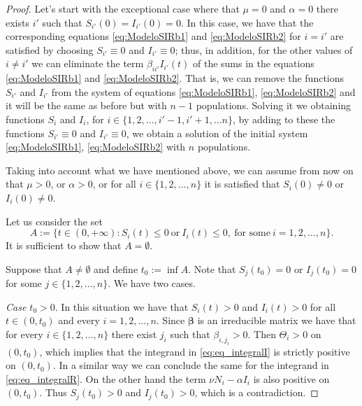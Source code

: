\documentclass[a4paper,10pt]{article}
\theoremstyle{remark}
\begin{document}
\begin{proof} 
Let's start with the exceptional case where that $\mu=0$ and $\alpha=0$ there exists $i'$ such that $S_{i'}(0)=I_{i'}(0)=0$. In this case, we have that the corresponding equations \eqref{eq:ModeloSIRb1} and \eqref{eq:ModeloSIRb2} for $i=i'$ are satisfied by choosing $S_{i'}\equiv 0$ and $I_{i'}\equiv 0$;  thus, in addition, for the other values of $i\neq i'$ we can eliminate the term $\beta_{ii'}I_{i'}(t)$ of the sums in the equations \eqref{eq:ModeloSIRb1} and \eqref{eq:ModeloSIRb2}. That is, we can remove the functions $S_{i'}$ and $I_{i'}$ from the system of equations \eqref{eq:ModeloSIRb1}, \eqref{eq:ModeloSIRb2} and it will be the same as before but with $n-1$ populations. Solving it we obtaining functions $S_{i}$ and $I_i$, for $i\in\{1,2,\ldots,i'-1,i'+1,\ldots n\}$, by adding to these the functions $S_{i'}\equiv 0$ and $I_{i'}\equiv 0$, we obtain a solution of the initial system \eqref{eq:ModeloSIRb1}, \eqref{eq:ModeloSIRb2} with $n$ populations.

Taking into account what we have mentioned above, we can assume from now on that $\mu>0$, or $\alpha>0$, or for all $i\in\{1,2,\ldots,n\}$ it is satisfied that $S_i(0)\neq 0$ or $I_i(0)\neq 0$.


Let us consider the set
$$A:=\{t\in (0,+\infty): S_i(t)\leq 0\ \text{or}\ I_i(t)\leq 0,\ \text{for some}\ i=1,2,\ldots,n\}.$$
It is sufficient to show that $A=\emptyset$. 

Suppose that $A\neq \emptyset$ and define $t_0:=\inf A$.
Note that  $S_j(t_0)=0$ or $I_j(t_0)=0$ for some 
$j\in\{1,2,\ldots,n\}$.  We have two cases. 

\emph{Case $t_0>0.$} In this situation we have that $S_i(t)>0$ and $I_i(t)>0$ for all $t\in (0,t_0)$ and every $i=1,2,\ldots,n$. Since $\boldsymbol{\beta}$ is an irreducible matrix we have that for every $i\in\{1,2,\ldots,n\}$ there exist $j_i$ such that $\beta_{i,j_i}>0$. Then $\Theta_i>0$ on $(0,t_0)$, which implies that the integrand in \eqref{eq:eq_integralI} is strictly positive on $(0,t_0)$. In a similar way we can conclude the same for the integrand in \eqref{eq:eq_integralR}. On the other hand the term $\nu N_i-\alpha I_i$ is also positive on $(0,t_0)$. Thus $S_j(t_0)>0$ and $I_j(t_0)>0$, which is a contradiction.


\end{proof}
\end{document}
